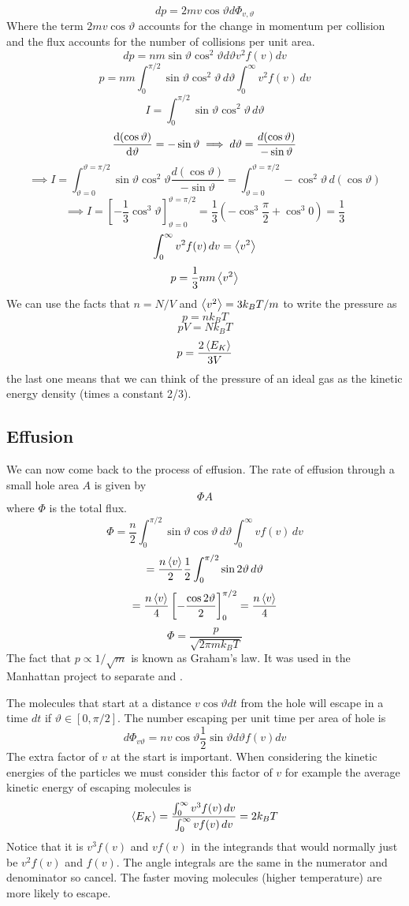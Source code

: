 \documentclass{article}
\begin{document}
    \[dp = 2mv\cos\vartheta d\Phi_{v,\vartheta}\]
    Where the term \(2mv\cos\vartheta\) accounts for the change in momentum per collision and the flux accounts for the number of collisions per unit area.
    \[dp = nm\sin\vartheta\cos^2\vartheta d\vartheta v^2f(v)dv\]
    \[p = nm\int_0^{\pi/2}\sin\vartheta\cos^2\vartheta\, d\vartheta \int_0^\infty v^2f(v)\,dv\]
    \[I = \int_0^{\pi/2}\sin\vartheta\cos^2\vartheta\, d\vartheta\]
    \[\dv{(\cos\vartheta)}{\vartheta} = -\sin\vartheta \implies d\vartheta = \frac{d(\cos\vartheta)}{-\sin\vartheta}\]
    \[\implies I = \int_{\vartheta = 0}^{\vartheta = \pi/2}\sin\vartheta\cos^2\vartheta\frac{d(\cos\vartheta)}{-\sin\vartheta} = \int_{\vartheta = 0}^{\vartheta = \pi/2}-\cos^2\vartheta\,d(\cos\vartheta)\]
    \[\implies I = \left[-\frac{1}{3}\cos^3\vartheta\right]_{\vartheta = 0}^{\vartheta = \pi/2} = \frac{1}{3}\left(-\cos^3 \frac{\pi}{2} + \cos^3 0\right) = \frac{1}{3}\]
    \[\int_0^\infty v^2f(v)\,dv = \left\langle{v^2}\right\rangle\]
    \[p = \frac{1}{3}nm\left\langle{v^2}\right\rangle\]
    We can use the facts that \(n = N/V\) and \(\left\langle{v^2}\right\rangle = 3k_BT/m\) to write the pressure as
    \[p = nk_BT\]
    \[pV = Nk_BT\]
    \[p = \frac{2\left\langle{E_K}\right\rangle}{3V}\]
    the last one means that we can think of the pressure of an ideal gas as the kinetic energy density (times a constant 2/3).
    
    \subsection{Effusion}
    We can now come back to the process of effusion.
    The rate of effusion through a small hole area \(A\) is given by
    \[\Phi A\]
    where \(\Phi\) is the total flux.
    \[\Phi = \frac{n}{2}\int_0^{\pi/2}\sin\vartheta\cos\vartheta\, d\vartheta \int_0^{\infty}v f(v)\,dv\]
    \[= \frac{n\left\langle{v}\right\rangle}{2}\frac{1}{2}\int_0^{\pi/2}\sin 2\vartheta\, d\vartheta\]
    \[= \frac{n\left\langle{v}\right\rangle}{4}\left[-\frac{\cos 2\vartheta}{2}\right]_0^{\pi/2} = \frac{n\left\langle{v}\right\rangle}{4}\]
    \[\Phi = \frac{p}{\sqrt{2\pi mk_BT}}\]
    The fact that \(p\propto 1/\sqrt{m}\) is known as Graham's law.
    It was used in the Manhattan project to separate  and .
    
    The molecules that start at a distance \(v \cos\vartheta dt\) from the hole will escape in a time \(dt\) if \(\vartheta \in [0, \pi/2]\).
    The number escaping per unit time per area of hole is
    \[d\Phi_{v\vartheta} = n v\cos\vartheta \frac{1}{2}\sin\vartheta d\vartheta f(v)dv\]
    The extra factor of \(v\) at the start is important.
    When considering the kinetic energies of the particles we must consider this factor of \(v\) for example the average kinetic energy of escaping molecules is
    \[\left\langle{E_K}\right\rangle = \frac{\int_0^\infty v^3f(v)\,dv}{\int_0^\infty vf(v)\,dv} = 2k_BT\]
    Notice that it is \(v^3f(v)\) and \(vf(v)\) in the integrands that would normally just be \(v^2f(v)\) and \(f(v)\).
    The angle integrals are the same in the numerator and denominator so cancel.
    The faster moving molecules (higher temperature) are more likely to escape.
    
\end{document}
